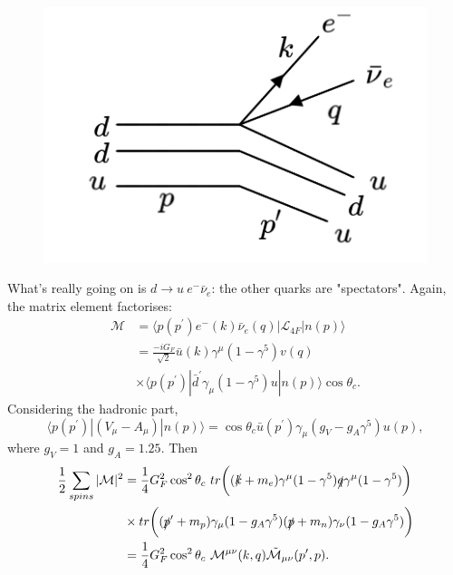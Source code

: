 \documentclass[a4paper,12pt]{article}
\begin{document}
\begin{figure}
  \centering
  \includegraphics[width=\linewidth]{figs/diag_3.png}
\end{figure}
What's really going on is $d \to u\ e^- \bar{\nu}_e$: the other quarks are "spectators". Again, the matrix element factorises:
\begin{equation}
\begin{split}
    \mathcal{M} &= \langle p(p^\prime) e^-(k)\bar{\nu}_e(q) | \mathcal{L}_{4F} | n(p) \rangle \\
    &= \frac{-iG_F}{\sqrt{2}} \bar{u}(k)\gamma^\mu(1-\gamma^5)v(q)\\
    &\times \langle p(p^\prime) | \bar{d}^\prime\gamma_\mu(1-\gamma^5)u | n(p) \rangle \cos\theta_c.
\end{split}
\end{equation}
Considering the hadronic part,
\begin{equation}
\langle p(p^\prime) | (V_\mu - A_\mu) | n(p) \rangle = \cos\theta_c\bar{u}(p^\prime)\gamma_\mu(g_V-g_A\gamma^5)u(p),
\end{equation}
where $g_V =1$ and $g_A = 1.25$. Then 
\begin{equation}
\begin{split}
\frac{1}{2}\sum_{spins}|\mathcal{M}|^2 &= \frac{1}{4}G_F^2\cos^2\theta_c\ tr\bigg((\slashed{k} + m_e)\gamma^\mu(1-\gamma^5)\slashed{q}\gamma^\mu(1-\gamma^5)\bigg)\\
&\times tr\bigg((\slashed{p}^\prime + m_p) \gamma_\mu(1-g_A\gamma^5)(\slashed{p}+m_n)\gamma_\nu(1-g_A\gamma^5)\bigg) \\
&= \frac{1}{4}G_F^2\cos^2\theta_c\ \mathcal{M}^{\mu\nu}(k,q)\tilde{\mathcal{M}}_{\mu\nu}(p^\prime,p).
\end{split}
\end{equation}
\end{document}
